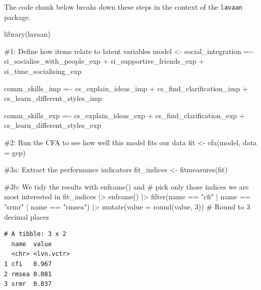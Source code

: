 \documentclass[
  letterpaper,
]{krantz}
\makeatletter
\newenvironment{Shaded}{\begin{snugshade}}{\end{snugshade}}
\newcommand{\AttributeTok}[1]{\textcolor[rgb]{0.40,0.45,0.13}{#1}}
\newcommand{\CommentTok}[1]{\textcolor[rgb]{0.37,0.37,0.37}{#1}}
\newcommand{\DecValTok}[1]{\textcolor[rgb]{0.68,0.00,0.00}{#1}}
\newcommand{\FunctionTok}[1]{\textcolor[rgb]{0.28,0.35,0.67}{#1}}
\newcommand{\NormalTok}[1]{\textcolor[rgb]{0.00,0.23,0.31}{#1}}
\newcommand{\OtherTok}[1]{\textcolor[rgb]{0.00,0.23,0.31}{#1}}
\newcommand{\SpecialCharTok}[1]{\textcolor[rgb]{0.37,0.37,0.37}{#1}}
\newcommand{\StringTok}[1]{\textcolor[rgb]{0.13,0.47,0.30}{#1}}
\newenvironment{kframe}{%
\medskip{}
\setlength{\fboxsep}{.8em}
 \def\at@end@of@kframe{}%
 \ifinner\ifhmode%
  \def\at@end@of@kframe{\end{minipage}}%
  \begin{minipage}{\columnwidth}%
 \fi\fi%
 \def\FrameCommand##1{\hskip\@totalleftmargin \hskip-\fboxsep
 \colorbox{shadecolor}{##1}\hskip-\fboxsep
     \hskip-\linewidth \hskip-\@totalleftmargin \hskip\columnwidth}%
 \MakeFramed {\advance\hsize-\width
   \@totalleftmargin\z@ \linewidth\hsize
   \@setminipage}}%
 {\par\unskip\endMakeFramed%
 \at@end@of@kframe}
\renewenvironment{Shaded}{\begin{kframe}}{\end{kframe}}
\makeatother
\begin{document}
The code chunk below breaks down these steps in the context of the
\texttt{lavaan} package.

\begin{Shaded}
\begin{Highlighting}[]
\FunctionTok{library}\NormalTok{(lavaan)}

\CommentTok{\#1: Define how items relate to latent variables}
\NormalTok{model }\OtherTok{\textless{}{-}} \StringTok{\textquotesingle{}}
\StringTok{social\_integration =\textasciitilde{}}
\StringTok{si\_socialise\_with\_people\_exp +}
\StringTok{si\_supportive\_friends\_exp +}
\StringTok{si\_time\_socialising\_exp}

\StringTok{comm\_skills\_imp =\textasciitilde{}}
\StringTok{cs\_explain\_ideas\_imp +}
\StringTok{cs\_find\_clarification\_imp +}
\StringTok{cs\_learn\_different\_styles\_imp}

\StringTok{comm\_skills\_exp =\textasciitilde{}}
\StringTok{cs\_explain\_ideas\_exp +}
\StringTok{cs\_find\_clarification\_exp +}
\StringTok{cs\_learn\_different\_styles\_exp}
\StringTok{\textquotesingle{}}

\CommentTok{\#2: Run the CFA to see how well this model fits our data}
\NormalTok{fit }\OtherTok{\textless{}{-}} \FunctionTok{cfa}\NormalTok{(model, }\AttributeTok{data =}\NormalTok{ gep)}

\CommentTok{\#3a: Extract the performance indicators}
\NormalTok{fit\_indices }\OtherTok{\textless{}{-}} \FunctionTok{fitmeasures}\NormalTok{(fit)}

\CommentTok{\#3b: We tidy the results with enframe() and}
\CommentTok{\#    pick only those indices we are most interested in}
\NormalTok{fit\_indices }\SpecialCharTok{|\textgreater{}}
  \FunctionTok{enframe}\NormalTok{() }\SpecialCharTok{|\textgreater{}}
  \FunctionTok{filter}\NormalTok{(name }\SpecialCharTok{==} \StringTok{"cfi"} \SpecialCharTok{|}
\NormalTok{         name }\SpecialCharTok{==} \StringTok{"srmr"} \SpecialCharTok{|}
\NormalTok{         name }\SpecialCharTok{==} \StringTok{"rmsea"}\NormalTok{) }\SpecialCharTok{|\textgreater{}}
  \FunctionTok{mutate}\NormalTok{(}\AttributeTok{value =} \FunctionTok{round}\NormalTok{(value, }\DecValTok{3}\NormalTok{))   }\CommentTok{\# Round to 3 decimal places}
\end{Highlighting}
\end{Shaded}

\begin{verbatim}
# A tibble: 3 x 2
  name  value     
  <chr> <lvn.vctr>
1 cfi   0.967     
2 rmsea 0.081     
3 srmr  0.037     
\end{verbatim}
\end{document}
